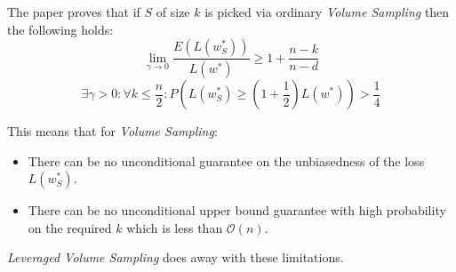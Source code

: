 \documentclass{article}
\begin{document}
    The paper proves that if $S$ of size $k$ is picked via ordinary \textit{Volume Sampling} then the following holds:
    \begin{equation}
        \lim\limits_{\gamma \to 0} \frac{E(L(w_{S}^\ast))}{L(w^\ast)} \geq 1+\frac{n-k}{n-d}
    \end{equation}
    \begin{equation}
        \exists \gamma > 0: \forall k \leq \frac{n}{2}: P(L(w_{S}^\ast) \geq (1+\frac{1}{2})L(w^\ast)) > \frac{1}{4}
    \end{equation}

    This means that for \textit{Volume Sampling}:
    \begin{itemize}
        \item There can be no unconditional guarantee on the unbiasedness of the loss $L(w_{S}^\ast)$.
        \item There can be no unconditional upper bound guarantee with high probability on the required $k$ which is less than $\mathcal{O}(n)$.
    \end{itemize}

    \textit{Leveraged Volume Sampling} does away with these limitations.
\end{document}
